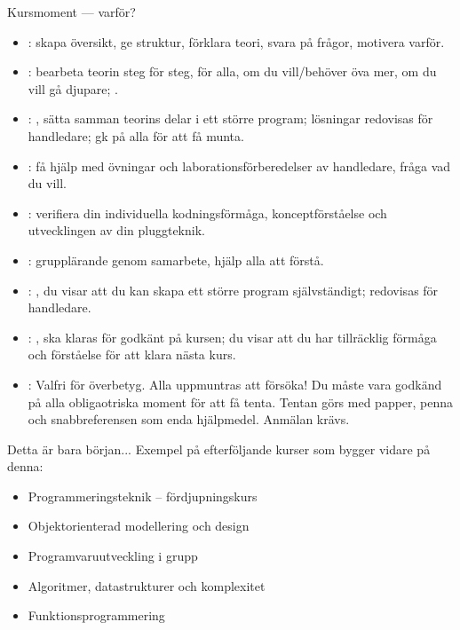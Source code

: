 \begin{Slide}{Kursmoment --- varför?}\SlideFontTiny
\begin{itemize}

\item {}: skapa översikt, ge struktur, förklara teori, svara på frågor, motivera varför.

\item {}: bearbeta teorin steg för steg,  för alla,  om du vill/behöver öva mer,  om du vill gå djupare; .

\item {}: , sätta samman teorins delar i ett större program; lösningar redovisas för handledare; gk på alla för att få munta.

\item {}: få hjälp med övningar och laborationsförberedelser av handledare, fråga vad du vill. 

\item {}: verifiera din individuella kodningsförmåga, konceptförståelse och utvecklingen av din pluggteknik.


\item {}: grupplärande genom samarbete, hjälp alla att förstå.

\item {}: , du visar att du kan skapa ett större program självständigt; redovisas för handledare.
\item {}: , ska klaras för godkänt på kursen; du visar att du har tillräcklig förmåga och förståelse för att klara nästa kurs. 

\item {}: Valfri för överbetyg. Alla uppmuntras att försöka! Du måste vara godkänd på alla obligaotriska moment för att få tenta. Tentan görs med papper, penna och snabbreferensen som enda hjälpmedel. Anmälan krävs.
\end{itemize}
\end{Slide}

\ifkompendium\else
\begin{SlideExtra}{Detta är bara början... }
Exempel på efterföljande kurser som bygger vidare på denna:
\begin{itemize}
\item Programmeringsteknik -- fördjupningskurs
\item Objektorienterad modellering och design
\item Programvaruutveckling i grupp
\item Algoritmer, datastrukturer och komplexitet
\item Funktionsprogrammering
\end{itemize}
\end{SlideExtra}


